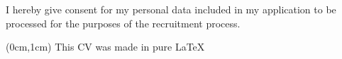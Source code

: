 \documentclass[10pt,a4paper,ragged2e,withhyper]{altacv/altacv}
\begin{document}
\begin{paracol}{2}
\medskip

I hereby give consent for my personal data included in my application to be processed for the purposes of the recruitment process.














\end{paracol}

\begin{textblock*}{\textwidth}(0cm,1cm)
  \centering
  {\scriptsize This CV was made in pure \LaTeX}
\end{textblock*}
\end{document}
